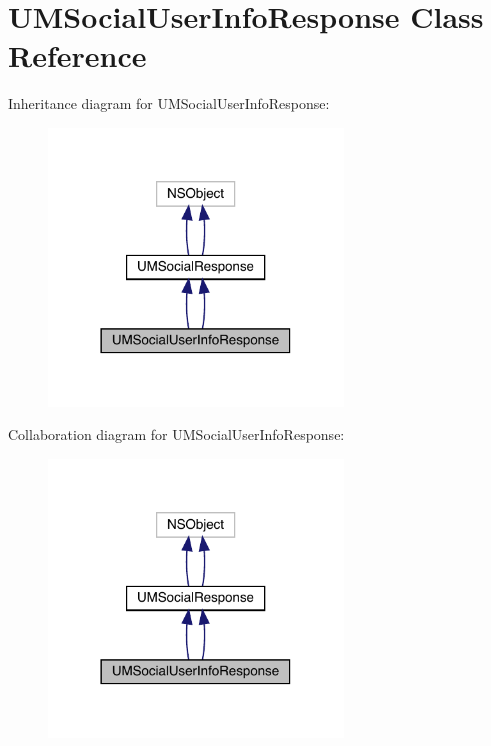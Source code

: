 \hypertarget{interface_u_m_social_user_info_response}{}\section{U\+M\+Social\+User\+Info\+Response Class Reference}
\label{interface_u_m_social_user_info_response}


Inheritance diagram for U\+M\+Social\+User\+Info\+Response\+:\nopagebreak
\begin{figure}[H]
\begin{center}
\leavevmode
\includegraphics[width=222pt]{interface_u_m_social_user_info_response__inherit__graph}
\end{center}
\end{figure}


Collaboration diagram for U\+M\+Social\+User\+Info\+Response\+:\nopagebreak
\begin{figure}[H]
\begin{center}
\leavevmode
\includegraphics[width=222pt]{interface_u_m_social_user_info_response__coll__graph}
\end{center}
\end{figure}
